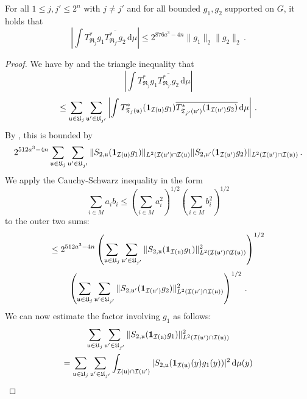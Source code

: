 \begin{lemma}
    \label{row-correlation}
    \leanok
    For all $1 \le j,j' \le 2^n$ with $j\ne j'$ and for all bounded $g_1, g_2$ supported on $G$, it holds that
    $$
        \left| \int T_{\mathfrak{R}_j}^*g_1 \overline{T_{\mathfrak{R}_{j'}}^*g_2} \, \mathrm{d}\mu \right| \le
        2^{876a^3-4n}\|g_1\|_2 \|g_2\|_2\,.
    $$
\end{lemma}

\begin{proof}
    \leanok
    We have by  and the triangle inequality that
    $$
        \left| \int T_{\mathfrak{R}_j}^*g_1 \overline{T_{\mathfrak{R}_{j'}}^*g_2} \, \mathrm{d}\mu \right|
    $$
    $$
        \le \sum_{{\mathfrak u} \in {\mathfrak U}_j} \sum_{{\mathfrak u}' \in {\mathfrak U}_{j'}} \left| \int T^*_{{\mathfrak T}_j({\mathfrak u})} (\mathbf{1}_{{\mathcal{I}}({\mathfrak u})} g_1) \overline{T^*_{{\mathfrak T}_{j'}({\mathfrak u}')} (\mathbf{1}_{{\mathcal{I}}({\mathfrak u}')} g_2)} \, \mathrm{d}\mu \right|\,.
    $$
    By , this is bounded by
    \begin{equation}
        \label{eq-S2uu'}
         2^{512a^3-4n} \sum_{{\mathfrak u} \in {\mathfrak U}_j} \sum_{{\mathfrak u}' \in {\mathfrak U}_{j'}} \|S_{2,{\mathfrak u}} (\mathbf{1}_{{\mathcal{I}}({\mathfrak u})}g_1)\|_{L^2({\mathcal{I}}({\mathfrak u}')\cap {\mathcal{I}}({\mathfrak u})} \|S_{2, {\mathfrak u}'} (\mathbf{1}_{{\mathcal{I}}({\mathfrak u}')}g_2)\|_{L^2({\mathcal{I}}({\mathfrak u}')\cap{\mathcal{I}}({\mathfrak u}))}\,.
    \end{equation}
    We apply the Cauchy-Schwarz inequality in the form
    \begin{equation*}
        \sum_{i \in M} a_i b_i \le (\sum_{i \in M} a_i^2 )^{1/2}(\sum_{i \in M} b_i^2 )^{1/2}
    \end{equation*} to the outer two sums:
    $$
        \le 2^{512a^3-4n} \left(\sum_{{\mathfrak u} \in {\mathfrak U}_j} \sum_{{\mathfrak u}' \in {\mathfrak U}_{j'}} \|S_{2,{\mathfrak u}} (\mathbf{1}_{{\mathcal{I}}({\mathfrak u})}g_1)\|_{L^2({\mathcal{I}}({\mathfrak u}')\cap {\mathcal{I}}({\mathfrak u}))}^2 \right)^{1/2}
    $$
    $$
        \left(\sum_{{\mathfrak u} \in {\mathfrak U}_j} \sum_{{\mathfrak u}' \in {\mathfrak U}_{j'}} \|S_{2,{\mathfrak u}'} (\mathbf{1}_{{\mathcal{I}}({\mathfrak u}')}g_2)\|_{L^2({\mathcal{I}}({\mathfrak u}')\cap{\mathcal{I}}({\mathfrak u}))}^2 \right)^{1/2}\,.
    $$
    We can now estimate the factor involving $g_1$ as follows:
    \begin{multline*}
        \sum_{\fu \in \fU_j}\sum_{\fu' \in \fU_{j'}} \|S_{2,\fu} (\mathbf{1}_{\scI(\fu)}g_1)\|_{L^2(\scI(\fu')\cap \scI(\fu))}^2
        \\ = \sum_{\fu \in \fU_j}\sum_{\fu' \in \fU_{j'}} \int_{\scI(\fu) \cap \scI(\fu')} |S_{2,\fu} (\mathbf{1}_{\scI(\fu)}(y)g_1(y))|^2 \, \mathrm{d}\mu(y)

\end{multline*}
\end{proof}
